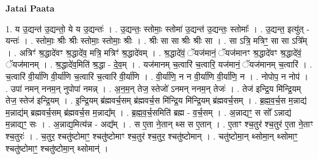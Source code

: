 \documentclass[17pt]{extarticle}
\begin{document}
\textbf{Jatai Paata} \newline

1. य उ॒द्यन्त॑ उ॒द्यन्तो॒ ये य उ॒द्यन्तः॑ । . उ॒द्यन्तः॒ स्तोमाः॒ स्तोमा॑ उ॒द्यन्त॑ उ॒द्यन्तः॒ स्तोमाः᳚ । . उ॒द्यन्त॒ इत्यु॑त् - यन्तः॑ । . स्तोमाः॒ श्रीः श्रीः स्तोमाः॒ स्तोमाः॒ श्रीः । . श्रीः सा सा श्रीः श्रीः सा । . सा ऽत्रि॒ मत्रिꣳ॒॒ सा सा ऽत्रि᳚म् । . अत्रिꣳ॑ श्र॒द्धादे॑वꣳ श्र॒द्धादे॑व॒ मत्रि॒ मत्रिꣳ॑ श्र॒द्धादे॑वम् । . श्र॒द्धादे॑वं॒ ॅयज॑मानं॒ ॅयज॑मानꣳ श्र॒द्धादे॑वꣳ श्र॒द्धादे॑वं॒ ॅयज॑मानम् । . श्र॒द्धादे॑व॒मिति॑ श्र॒द्धा - दे॒व॒म् । . यज॑मानम् च॒त्वारि॑ च॒त्वारि॒ यज॑मानं॒ ॅयज॑मानम् च॒त्वारि॑ । . च॒त्वारि॑ वी॒र्या॑णि वी॒र्या॑णि च॒त्वारि॑ च॒त्वारि॑ वी॒र्या॑णि । . वी॒र्या॑णि॒ न न वी॒र्या॑णि वी॒र्या॑णि॒ न । . नोपोप॒ न नोप॑ । . उपा॑ नमन् ननम॒न् नुपोपा॑ नमन्न् । . अ॒न॒म॒न् तेज॒ स्तेजो॑ ऽनमन् ननम॒न् तेजः॑ । . तेज॑ इन्द्रि॒य मि॑न्द्रि॒यम् तेज॒ स्तेज॑ इन्द्रि॒यम् । . इ॒न्द्रि॒यम् ब्र॑ह्मवर्च॒सम् ब्र॑ह्मवर्च॒स मि॑न्द्रि॒य मि॑न्द्रि॒यम् ब्र॑ह्मवर्च॒सम् । . ब्र॒ह्म॒व॒र्च॒स म॒न्नाद्य॑ म॒न्नाद्य॑म् ब्रह्मवर्च॒सम् ब्र॑ह्मवर्च॒स म॒न्नाद्य᳚म् । . ब्र॒ह्म॒व॒र्च॒समिति॑ ब्रह्म - व॒र्च॒सम् । . अ॒न्नाद्यꣳ॒॒ स सो᳚ ऽन्नाद्य॑ म॒न्नाद्यꣳ॒॒ सः । . अ॒न्नाद्य॒मित्य॑न्न - अद्य᳚म् । . स ए॒ता ने॒तान् थ्स स ए॒तान् । . ए॒ताꣳ श्च॒तुर॑ श्च॒तुर॑ ए॒ता ने॒ताꣳ श्च॒तुरः॑ । . च॒तुर॒ श्चतु॑ष्टोमाꣳ॒॒ श्चतु॑ष्टोमाꣳ श्च॒तुर॑ श्च॒तुर॒ श्चतु॑ष्टोमान् । . चतु॑ष्टोमा॒न् थ्सोमा॒न् थ्सोमाꣳ॒॒ श्चतु॑ष्टोमाꣳ॒॒ श्चतु॑ष्टोमा॒न् थ्सोमान्॑ । \newline
\end{document}
